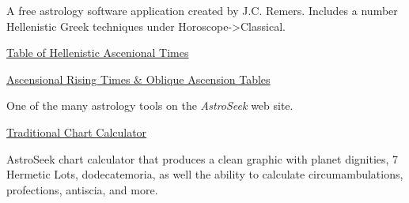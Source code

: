 	A free astrology software application created by J.C. Remers. Includes a number Hellenistic Greek techniques under Horoscope->Classical.

\noindent\href{http://www.projecthindsight.com/images/TablesPDFs/Tb2-AscT-sysAB.pdf}{Table of Hellenistic Ascenional Times}
	
	\noindent\href{https://horoscopes.astro-seek.com/calculate-ascensional-rising-times/?latitude=&narozeni_lat_custom_stupne=0&narozeni_lat_custom_minuty=0&narozeni_lat_custom_smer=0&narozeni_rok=2022&aya=&oa=&decimal=0}{Ascensional Rising Times \& Oblique Ascension Tables}
	
	One of the many astrology tools on the \textsl{AstroSeek} web site.
	
	\noindent\href{https://horoscopes.astro-seek.com/traditional-astrology}{Traditional Chart Calculator}
	
	AstroSeek chart calculator that produces a clean graphic with planet dignities, 7 Hermetic Lots, dodecatemoria, as well the ability to calculate circumambulations, profections, antiscia, and more.
	
\newpage
